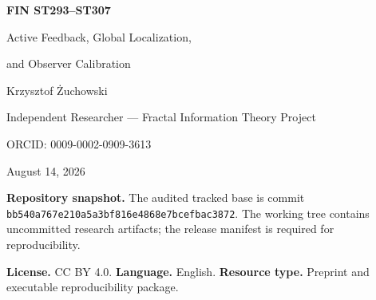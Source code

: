 \documentclass[11pt,a4paper]{article}
\begin{document}
\hypersetup{pageanchor=false}
\begin{titlepage}\centering
\vspace*{1cm}{\Large Fractal Information Theory Project\par}\vspace{.9cm}
{\huge\bfseries FIN ST293--ST307\par}\vspace{.35cm}
{\LARGE Active Feedback, Global Localization,\par}{\LARGE and Observer Calibration\par}
\vspace{1cm}{\large Analytical, interval, and bounded computational research report\par}
\vfill{\Large Krzysztof \.{Z}uchowski\par}\vspace{.2cm}
{\large Independent Researcher --- Fractal Information Theory Project\par}
{\large ORCID: 0009-0002-0909-3613\par}\vspace{.8cm}
{\large August 14, 2026\par}\vspace{.3cm}{\large Release 10.77\par}\vfill
\begin{minipage}{.92\textwidth}\small
\textbf{Repository snapshot.} The audited tracked base is commit
\texttt{bb540a767e210a5a3bf816e4868e7bcefbac3872}. The working tree contains
uncommitted research artifacts; the release manifest is required for reproducibility.

\medskip\textbf{License.} CC BY 4.0. \quad \textbf{Language.} English. \quad
\textbf{Resource type.} Preprint and executable reproducibility package.
\end{minipage}\end{titlepage}
\hypersetup{pageanchor=true}
\end{document}
